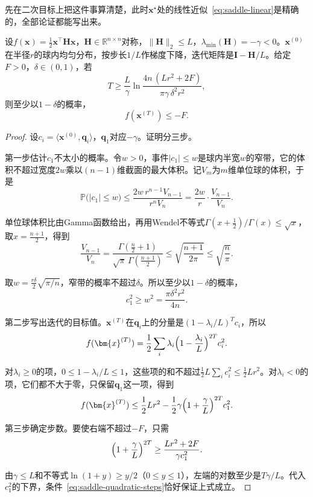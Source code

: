 先在二次目标上把这件事算清楚，此时$\bm{x}^\star$处的线性近似~\eqref{eq:saddle-linear}是精确的，全部论证都能写出来。

\begin{theorem}[二次目标上的逃离]
 \label{thm:saddle-quadratic-escape}
 设$f(\bm{x})=\tfrac12\bm{x}^\top\bm{H}\bm{x}$，$\bm{H}\in\mathbb{R}^{n\times n}$对称，$\lVert\bm{H}\rVert_2\leq L$，$\lambda_{\min}(\bm{H})=-\gamma<0$。$\bm{x}^{(0)}$在半径$r$的球内均匀分布，按步长$1/L$作梯度下降，迭代矩阵是$\bm{I}-\bm{H}/L$。给定$F>0$，$\delta\in(0,1)$，若
 \begin{equation}
  T\geq\frac{L}{\gamma}\ln\frac{4n\,(Lr^2+2F)}{\pi\gamma\,\delta^2r^2},
  \label{eq:saddle-quadratic-steps}
 \end{equation}
 则至少以$1-\delta$的概率，
 \begin{equation}
  f(\bm{x}^{(T)})\leq-F.
  \label{eq:saddle-quadratic-result}
 \end{equation}
\end{theorem}

\begin{proof}
 设$c_i=\langle\bm{x}^{(0)},\bm{q}_i\rangle$，$\bm{q}_1$对应$-\gamma$。证明分三步。

 第一步估计$c_1$不太小的概率。令$w>0$，事件$\lvert c_1\rvert\leq w$是球内半宽$w$的窄带，它的体积不超过宽度$2w$乘以$(n-1)$维截面的最大体积。记$V_m$为$m$维单位球的体积，于是
 \[
  \mathbb{P}\bigl(\lvert c_1\rvert\leq w\bigr)\leq\frac{2w\,r^{n-1}V_{n-1}}{r^nV_n}=\frac{2w}{r}\cdot\frac{V_{n-1}}{V_n}.
 \]

 单位球体积比由Gamma函数给出，再用Wendel不等式$\Gamma(x+\tfrac12)/\Gamma(x)\leq\sqrt{x}$，取$x=\tfrac{n+1}{2}$，得到
 \[
  \frac{V_{n-1}}{V_n}=\frac{\Gamma(\frac n2+1)}{\sqrt\pi\,\Gamma(\frac{n+1}{2})}\leq\sqrt{\frac{n+1}{2\pi}}\leq\sqrt{\frac{n}{\pi}}.
 \]

 取$w=\tfrac{r\delta}{2}\sqrt{\pi/n}$，窄带的概率不超过$\delta$。所以至少以$1-\delta$的概率，
 \[
  c_1^2\geq w^2=\frac{\pi\delta^2r^2}{4n}.
 \]

 第二步写出迭代的目标值。$\bm{x}^{(T)}$在$\bm{q}_i$上的分量是$(1-\lambda_i/L)^Tc_i$，所以
 \[
  f(\bm{x}^{(T)})=\frac12\sum_i\lambda_i\Bigl(1-\frac{\lambda_i}{L}\Bigr)^{2T}c_i^2.
 \]

 对$\lambda_i\geq0$的项，$0\leq1-\lambda_i/L\leq1$，这些项的和不超过$\tfrac12L\sum_ic_i^2\leq\tfrac12Lr^2$。对$\lambda_i<0$的项，它们都不大于零，只保留$\bm{q}_1$这一项，得到
 \[
  f(\bm{x}^{(T)})\leq\frac12Lr^2-\frac12\gamma\Bigl(1+\frac{\gamma}{L}\Bigr)^{2T}c_1^2.
 \]

 第三步确定步数。要使右端不超过$-F$，只需
 \[
  \Bigl(1+\frac{\gamma}{L}\Bigr)^{2T}\geq\frac{Lr^2+2F}{\gamma c_1^2}.
 \]

 由$\gamma\leq L$和不等式$\ln(1+y)\geq y/2$（$0\leq y\leq1$），左端的对数至少是$T\gamma/L$。代入$c_1^2$的下界，条件~\eqref{eq:saddle-quadratic-steps}恰好保证上式成立。
\end{proof}

